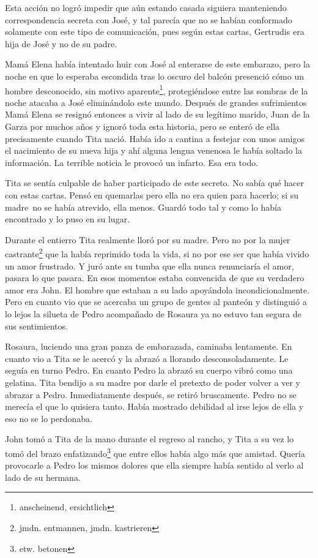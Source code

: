 Esta acción no logró impedir que aún estando casada siguiera manteniendo
correspondencia secreta con José, y tal parecía que no se habían
conformado solamente con este tipo de comunicación, pues según estas
cartas, Gertrudis era hija de José y no de su padre.

Mamá Elena había intentado huir con José al enterarse de este embarazo,
pero la noche en que lo esperaba escondida tras lo oscuro del balcón
presenció cómo un hombre desconocido, sin motivo aparente\footnote{anscheinend, ersichtlich},
protegiéndose entre las sombras de la noche atacaba a José eliminándolo
este mundo.
Después de grandes sufrimientos Mamá Elena se resignó entonces a vivir
al lado de su legítimo marido, Juan de la Garza por muchos años y
ignoró toda esta historia, pero se enteró de ella precisamente cuando
Tita nació. Había ido a cantina a festejar con unos amigos el nacimiento
de su nueva hija y ahí alguna lengua venenosa le había soltado la
información. La terrible noticia le provocó un infarto. Esa era todo.

Tita se sentía culpable de haber participado de este secreto. No sabía
qué hacer con estas cartas. Pensó en quemarlas pero ella no era quien
para hacerlo; si su madre~no se había atrevido, ella menos. Guardó
todo tal y como lo había encontrado y lo puso en su lugar.

Durante el entierro Tita realmente lloró por su madre. Pero no por la
mujer castrante\footnote{jmdn. entmannen, jmdn. kastrieren}
que la había reprimido
toda la vida, si no por ese ser que había vivido un amor frustrado.
Y juró ante su tumba que ella nunca renunciaría
el amor, pasara lo que pasara. En esos momentos estaba
convencida de que su verdadero amor era John. El hombre que estaban a su
lado apoyándola incondicionalmente. Pero en cuanto vio que se acercaba
un grupo de gentes al panteón y distinguió a lo lejos la silueta de
Pedro acompañado de Rosaura ya no estuvo tan segura de sus sentimientos.

Rosaura, luciendo una gran panza de embarazada, caminaba lentamente. En
cuanto vio a Tita se le acercó y la abrazó a llorando desconsoladamente.
Le seguía en turno Pedro. En cuanto Pedro la abrazó su cuerpo vibró como
una gelatina. Tita bendijo
a su madre por darle el pretexto de poder volver a ver y abrazar a Pedro.
Inmediatamente después, se retiró bruscamente. Pedro no se merecía el que
lo quisiera tanto. Había mostrado debilidad al irse lejos de ella y eso
no se lo perdonaba.

John tomó a Tita de la mano durante el regreso al rancho, y Tita a su
vez lo tomó del brazo enfatizando\footnote{etw. betonen} que
entre ellos había algo más que amistad. Quería provocarle a Pedro los
mismos dolores que ella siempre había sentido al verlo al lado de su
hermana.

